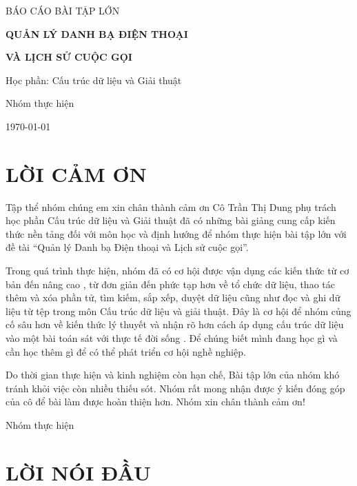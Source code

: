 \documentclass[12pt,a4paper]{report}
\begin{document}
\begin{titlepage}
\centering
{\Large BÁO CÁO BÀI TẬP LỚN\par}
\vspace{1.5cm}
{\huge\bfseries QUẢN LÝ DANH BẠ ĐIỆN THOẠI\par}
\vspace{0.3cm}
{\huge\bfseries VÀ LỊCH SỬ CUỘC GỌI\par}
\vspace{1.5cm}
{\large Học phần: Cấu trúc dữ liệu và Giải thuật\par}
\vfill
{\large Nhóm thực hiện\par}
\vspace{2cm}
{\large \today\par}
\end{titlepage}
\tableofcontents
\clearpage
{}
\chapter*{LỜI CẢM ƠN}

Tập thể nhóm chúng em xin chân thành cảm ơn Cô Trần Thị Dung phụ trách học phần Cấu trúc dữ liệu và Giải thuật đã có những bài giảng cung cấp kiến thức nền tảng đối với môn học và định hướng để nhóm thực hiện bài tập lớn với đề tài “Quản lý Danh bạ Điện thoại và Lịch sử cuộc gọi”.\par
Trong quá trình thực hiện, nhóm đã có cơ hội được vận dụng các kiến thức từ cơ bản đến nâng cao , từ đơn giản đến phức tạp hơn về tổ chức dữ liệu, thao tác thêm và xóa phần tử, tìm kiếm, sắp xếp, duyệt dữ liệu cũng như đọc và ghi dữ liệu từ tệp trong môn Cấu trúc dữ liệu và giải thuật. Đây là cơ hội để nhóm củng cố  sâu hơn về kiến thức lý thuyết và nhận rõ hơn cách áp dụng cấu trúc dữ liệu vào một bài toán sát với thực tế đời sống . Để chúng biết mình đang học gì và cần học thêm gì để có thể phát triển cơ hội nghề nghiệp.\par
Do thời gian thực hiện và kinh nghiệm còn hạn chế, Bài tập lớn của nhóm khó tránh khỏi việc còn nhiều thiếu sót. Nhóm rất mong nhận được ý kiến đóng góp của cô để bài làm được hoàn thiện hơn. Nhóm xin chân thành cảm ơn!\par
Nhóm thực hiện\par
\chapter*{LỜI NÓI ĐẦU}
\end{document}
